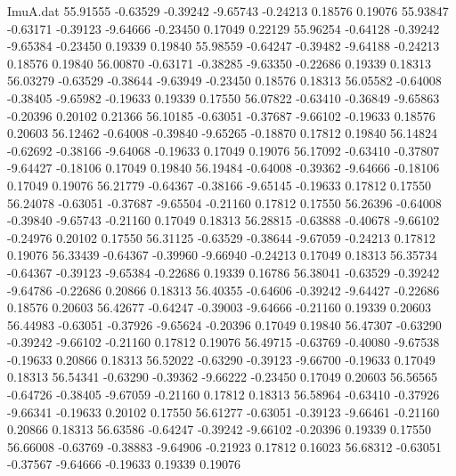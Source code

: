 \begin{filecontents}{ImuA.dat}
  55.91555   -0.63529   -0.39242   -9.65743   -0.24213    0.18576    0.19076
  55.93847   -0.63171   -0.39123   -9.64666   -0.23450    0.17049    0.22129
  55.96254   -0.64128   -0.39242   -9.65384   -0.23450    0.19339    0.19840
  55.98559   -0.64247   -0.39482   -9.64188   -0.24213    0.18576    0.19840
  56.00870   -0.63171   -0.38285   -9.63350   -0.22686    0.19339    0.18313
  56.03279   -0.63529   -0.38644   -9.63949   -0.23450    0.18576    0.18313
  56.05582   -0.64008   -0.38405   -9.65982   -0.19633    0.19339    0.17550
  56.07822   -0.63410   -0.36849   -9.65863   -0.20396    0.20102    0.21366
  56.10185   -0.63051   -0.37687   -9.66102   -0.19633    0.18576    0.20603
  56.12462   -0.64008   -0.39840   -9.65265   -0.18870    0.17812    0.19840
  56.14824   -0.62692   -0.38166   -9.64068   -0.19633    0.17049    0.19076
  56.17092   -0.63410   -0.37807   -9.64427   -0.18106    0.17049    0.19840
  56.19484   -0.64008   -0.39362   -9.64666   -0.18106    0.17049    0.19076
  56.21779   -0.64367   -0.38166   -9.65145   -0.19633    0.17812    0.17550
  56.24078   -0.63051   -0.37687   -9.65504   -0.21160    0.17812    0.17550
  56.26396   -0.64008   -0.39840   -9.65743   -0.21160    0.17049    0.18313
  56.28815   -0.63888   -0.40678   -9.66102   -0.24976    0.20102    0.17550
  56.31125   -0.63529   -0.38644   -9.67059   -0.24213    0.17812    0.19076
  56.33439   -0.64367   -0.39960   -9.66940   -0.24213    0.17049    0.18313
  56.35734   -0.64367   -0.39123   -9.65384   -0.22686    0.19339    0.16786
  56.38041   -0.63529   -0.39242   -9.64786   -0.22686    0.20866    0.18313
  56.40355   -0.64606   -0.39242   -9.64427   -0.22686    0.18576    0.20603
  56.42677   -0.64247   -0.39003   -9.64666   -0.21160    0.19339    0.20603
  56.44983   -0.63051   -0.37926   -9.65624   -0.20396    0.17049    0.19840
  56.47307   -0.63290   -0.39242   -9.66102   -0.21160    0.17812    0.19076
  56.49715   -0.63769   -0.40080   -9.67538   -0.19633    0.20866    0.18313
  56.52022   -0.63290   -0.39123   -9.66700   -0.19633    0.17049    0.18313
  56.54341   -0.63290   -0.39362   -9.66222   -0.23450    0.17049    0.20603
  56.56565   -0.64726   -0.38405   -9.67059   -0.21160    0.17812    0.18313
  56.58964   -0.63410   -0.37926   -9.66341   -0.19633    0.20102    0.17550
  56.61277   -0.63051   -0.39123   -9.66461   -0.21160    0.20866    0.18313
  56.63586   -0.64247   -0.39242   -9.66102   -0.20396    0.19339    0.17550
  56.66008   -0.63769   -0.38883   -9.64906   -0.21923    0.17812    0.16023
  56.68312   -0.63051   -0.37567   -9.64666   -0.19633    0.19339    0.19076

\end{filecontents}
